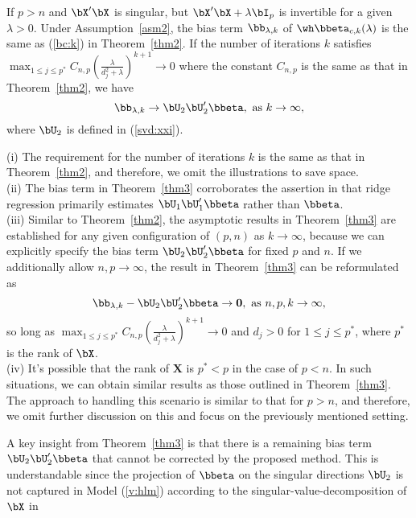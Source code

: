\begin{theorem}\label{thm3}
    If $p>n$ and $\bX'\bX$ is singular, but $\bX'\bX+\lambda\bI_p$ is invertible for a given $\lambda>0$. Under Assumption~\ref{asm2}, the bias term $\bb_{\lambda,k}$ of $\wh\bbeta_{c,k}(\lambda)$ is the same as (\ref{bc:k}) in Theorem~\ref{thm2}. If the number of iterations $k$ satisfies $\max_{1\leq j\leq p^*}C_{n,p}(\frac{\lambda}{d_j^2+\lambda})^{k+1}\rightarrow 0$ where the constant $C_{n,p}$ is the same as that in Theorem~\ref{thm2}, we have
    \[\bb_{\lambda,k}\rightarrow\bU_2\bU_2'\bbeta,\,\,\text{as}\,\, k\rightarrow \infty,\]
    where $\bU_2$ is defined in (\ref{svd:xxi}).
\end{theorem}
\begin{remark}\label{rm3}
   (i) The requirement for the number of iterations $k$ is the same as that in Theorem~\ref{thm2}, and therefore, we omit the illustrations to save space.\\
   (ii) The bias term in Theorem~\ref{thm3} corroborates the assertion in \cite{shao2012estimation} that ridge regression primarily estimates 
 $\bU_1\bU_1'\bbeta$ rather than $\bbeta$.\\
   (iii) Similar to Theorem~\ref{thm2}, the asymptotic results in Theorem~\ref{thm3} are established for any given configuration of $(p,n)$ as $k\rightarrow\infty$, because we can explicitly specify the bias term $\bU_2\bU_2'\bbeta$ for fixed $p$ and $n$. If we additionally allow $n,p\rightarrow\infty$, the result in Theorem~\ref{thm3} can be reformulated as
   \[ \bb_{\lambda,k}-\bU_2\bU_2'\bbeta\rightarrow{\bf 0},\,\,\text{as}\,\, n,p,k\rightarrow \infty,\]
   so long as $\max_{1\leq j\leq p^*}C_{n,p}(\frac{\lambda}{d_j^2+\lambda})^{k+1}\rightarrow 0$ and $d_j>0$ for $1\leq j\leq p^*$, where $p^*$ is the rank of $\bX$.\\
   (iv) It's possible that the rank of $\mathbf{X}$ is $p^*<p$ in the case of $p < n$. In such situations, we can obtain similar results as those outlined in Theorem~\ref{thm3}. The approach to handling this scenario is similar to that for $p>n$, and therefore, we omit further discussion on this and focus on the previously mentioned setting.
\end{remark}
A key insight from Theorem~\ref{thm3} is that there is a remaining bias term $\bU_2\bU_2'\bbeta$ that cannot be corrected by the proposed method. This is understandable since the projection of $\bbeta$ on the singular directions $\bU_2$ is not captured in Model (\ref{v:hlm}) according to the singular-value-decomposition of $\bX$ in 
